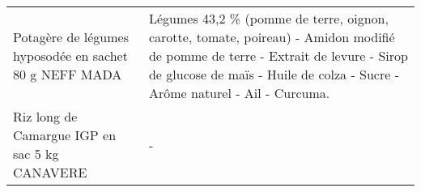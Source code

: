 \begin{longtable}{p{5cm}p{10cm}}
                                                   Potagère de légumes hyposodée en sachet 80 g NEFF MADA &                                                                                                                                                                                                                                                                                                                                                                                                                                                                                                                                                                                                                                                                                                                                                                                                                            Légumes 43,2 \% (pomme de terre, oignon, carotte, tomate, poireau) - Amidon modifié de pomme de terre - Extrait de levure - Sirop de glucose de maïs - Huile de colza - Sucre - Arôme naturel - Ail - Curcuma. \\
                                                            Riz long de Camargue IGP en sac 5 kg CANAVERE &                                                                                                                                                                                                                                                                                                                                                                                                                                                                                                                                                                                                                                                                                                                                                                                                                                                                                                                                                                                                                                        - \\

\end{longtable}
